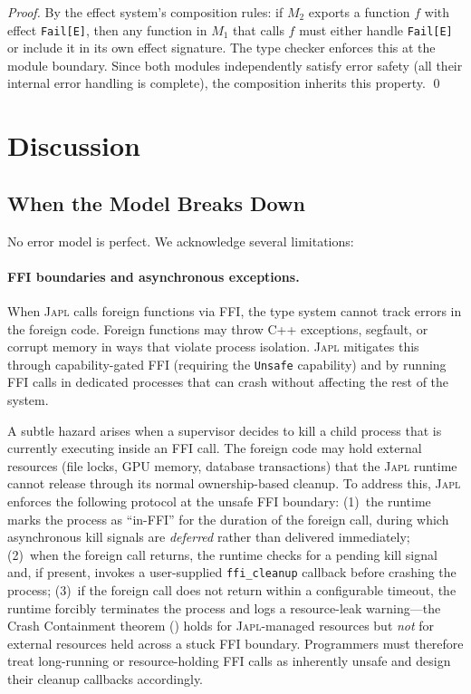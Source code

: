 \documentclass[11pt,twocolumn]{article}
\newcommand{\japl}{\textsc{Japl}}
\begin{document}
\begin{proof}
By the effect system's composition rules: if $M_2$ exports a function $f$ with effect \texttt{Fail[E]}, then any function in $M_1$ that calls $f$ must either handle \texttt{Fail[E]} or include it in its own effect signature. The type checker enforces this at the module boundary. Since both modules independently satisfy error safety (all their internal error handling is complete), the composition inherits this property. \qed
\end{proof}

\section{Discussion}\label{sec:discussion}

\subsection{When the Model Breaks Down}

No error model is perfect. We acknowledge several limitations:

\paragraph{FFI boundaries and asynchronous exceptions.} When \japl{} calls foreign functions via FFI, the type system cannot track errors in the foreign code. Foreign functions may throw C++ exceptions, segfault, or corrupt memory in ways that violate process isolation. \japl{} mitigates this through capability-gated FFI (requiring the \texttt{Unsafe} capability) and by running FFI calls in dedicated processes that can crash without affecting the rest of the system.

A subtle hazard arises when a supervisor decides to kill a child process that is currently executing inside an FFI call. The foreign code may hold external resources (file locks, GPU memory, database transactions) that the \japl{} runtime cannot release through its normal ownership-based cleanup. To address this, \japl{} enforces the following protocol at the unsafe FFI boundary: (1)~the runtime marks the process as ``in-FFI'' for the duration of the foreign call, during which asynchronous kill signals are \emph{deferred} rather than delivered immediately; (2)~when the foreign call returns, the runtime checks for a pending kill signal and, if present, invokes a user-supplied \texttt{ffi\_cleanup} callback before crashing the process; (3)~if the foreign call does not return within a configurable timeout, the runtime forcibly terminates the process and logs a resource-leak warning---the Crash Containment theorem () holds for \japl{}-managed resources but \emph{not} for external resources held across a stuck FFI boundary. Programmers must therefore treat long-running or resource-holding FFI calls as inherently unsafe and design their cleanup callbacks accordingly.
\end{document}
